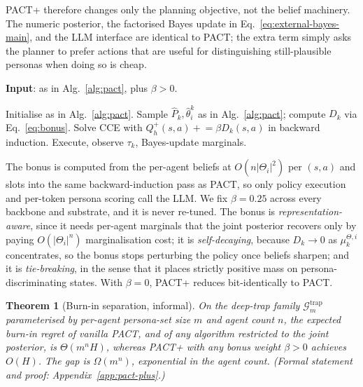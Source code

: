 \documentclass{article}
\newtheorem{theorem}{Theorem}[section]
\def\textsuperscript#1{#1}%
\begin{document}
PACT\textsuperscript{+} therefore changes only the planning objective, not the belief machinery. The numeric posterior, the factorised Bayes update in Eq.~\eqref{eq:external-bayes-main}, and the LLM interface are identical to PACT; the extra term simply asks the planner to prefer actions that are useful for distinguishing still-plausible personas when doing so is cheap.

\begin{algorithm}[t]
\caption{PACT\textsuperscript{+}}\label{alg:pact-plus}
\textbf{Input}: as in Alg.~\ref{alg:pact}, plus $\beta>0$.\\
\begin{algorithmic}[1]
\STATE Initialise as in Alg.~\ref{alg:pact}.
  \STATE Sample $\hat P_k,\hat\theta_i^k$ as in Alg.~\ref{alg:pact}; compute $D_k$ via Eq.~\eqref{eq:bonus}.
  \STATE Solve CCE with $Q_h^+(s,a)\mathrel{+}=\beta D_k(s,a)$ in backward induction.
  \STATE Execute, observe $\tau_k$, Bayes-update marginals.
\ENDFOR
\end{algorithmic}
\end{algorithm}

The bonus is computed from the per-agent beliefs at $O(n|\Theta_i|^2)$ per $(s,a)$ and slots into the same backward-induction pass as PACT, so only policy execution and per-token persona scoring call the LLM. We fix $\beta=0.25$ across every backbone and substrate, and it is never re-tuned. The bonus is \emph{representation-aware}, since it needs per-agent marginals that the joint posterior recovers only by paying $O(|\Theta_i|^n)$ marginalisation cost; it is \emph{self-decaying}, because $D_k\to 0$ as $\mu_k^{\Theta,i}$ concentrates, so the bonus stops perturbing the policy once beliefs sharpen; and it is \emph{tie-breaking}, in the sense that it places strictly positive mass on persona-discriminating states. With $\beta=0$, PACT\textsuperscript{+} reduces bit-identically to PACT.

\begin{theorem}[Burn-in separation, informal]
\label{thm:burnin-main}
On the deep-trap family $\mathcal G_m^{\mathrm{trap}}$ parameterised by per-agent persona-set size $m$ and agent count $n$, the expected burn-in regret of vanilla PACT, and of any algorithm restricted to the joint posterior, is $\Theta(m^n H)$, whereas PACT\textsuperscript{+} with any bonus weight $\beta>0$ achieves $O(H)$. The gap is $\Omega(m^n)$, exponential in the agent count. (Formal statement and proof: Appendix~\ref{app:pact-plus}.)
\end{theorem}
\end{document}
